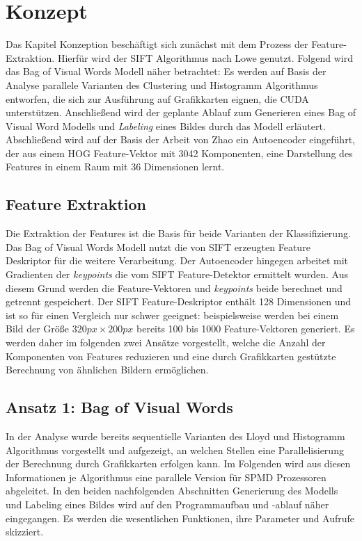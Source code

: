 \chapter{Konzept}

Das Kapitel Konzeption beschäftigt sich zunächst mit dem Prozess der Feature-Extraktion. Hierfür wird der SIFT Algorithmus nach Lowe genutzt. Folgend wird das Bag of Visual Words Modell näher betrachtet: Es werden auf Basis der Analyse parallele Varianten des Clustering und Histogramm Algorithmus entworfen, die sich zur Ausführung auf Grafikkarten eignen, die CUDA unterstützen. Anschließend wird der geplante Ablauf zum Generieren eines Bag of Visual Word Modells und \textit{Labeling} eines Bildes durch das Modell erläutert.
Abschließend wird auf der Basis der Arbeit von Zhao \cite{aed2016} ein Autoencoder eingeführt, der aus einem HOG Feature-Vektor mit 3042 Komponenten, eine Darstellung des Features in einem Raum mit 36 Dimensionen lernt.

\section{Feature Extraktion}

Die Extraktion der Features ist die Basis für beide Varianten der Klassifizierung. Das Bag of Visual Words Modell nutzt die von SIFT erzeugten Feature Deskriptor für die weitere Verarbeitung. Der Autoencoder hingegen arbeitet mit Gradienten der \textit{keypoints} die vom SIFT Feature-Detektor ermittelt wurden. Aus diesem Grund werden die Feature-Vektoren und \textit{keypoints} beide berechnet und getrennt gespeichert.
Der SIFT Feature-Deskriptor enthält 128 Dimensionen und ist so für einen Vergleich nur schwer geeignet: beispielsweise werden bei einem Bild der Größe $320px \times 200px$ bereits 100 bis 1000 Feature-Vektoren generiert. Es werden daher im folgenden zwei Ansätze vorgestellt, welche die Anzahl der Komponenten von Features reduzieren und eine durch Grafikkarten gestützte Berechnung von ähnlichen Bildern ermöglichen.


\section{Ansatz 1: Bag of Visual Words}

In der Analyse wurde bereits sequentielle Varianten des Lloyd und Histogramm Algorithmus vorgestellt und aufgezeigt, an welchen Stellen eine Parallelisierung der Berechnung durch Grafikkarten erfolgen kann. Im Folgenden wird aus diesen Informationen je Algorithmus eine parallele Version für SPMD Prozessoren abgeleitet.
In den beiden nachfolgenden Abschnitten Generierung des Modells und Labeling eines Bildes wird auf den Programmaufbau und -ablauf näher eingegangen. Es werden die wesentlichen Funktionen, ihre Parameter und Aufrufe skizziert.

